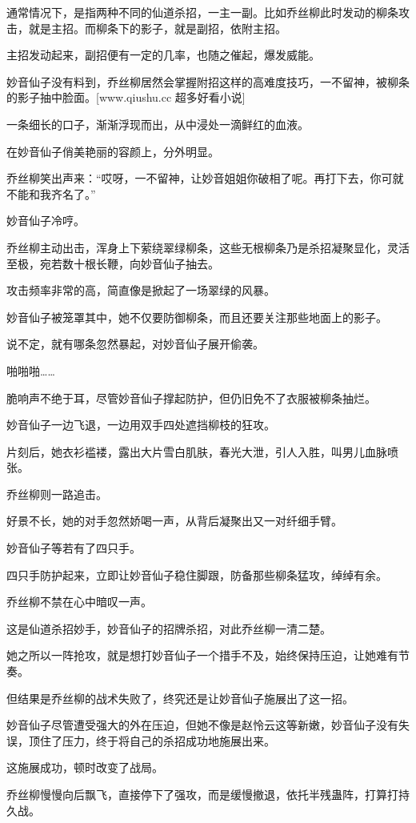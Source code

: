 \begin{this_body}
通常情况下，是指两种不同的仙道杀招，一主一副。比如乔丝柳此时发动的柳条攻击，就是主招。而柳条下的影子，就是副招，依附主招。

主招发动起来，副招便有一定的几率，也随之催起，爆发威能。

妙音仙子没有料到，乔丝柳居然会掌握附招这样的高难度技巧，一不留神，被柳条的影子抽中脸面。[www.qiushu.cc 超多好看小说]

一条细长的口子，渐渐浮现而出，从中浸处一滴鲜红的血液。

在妙音仙子俏美艳丽的容颜上，分外明显。

乔丝柳笑出声来：“哎呀，一不留神，让妙音姐姐你破相了呢。再打下去，你可就不能和我齐名了。”

妙音仙子冷哼。

乔丝柳主动出击，浑身上下萦绕翠绿柳条，这些无根柳条乃是杀招凝聚显化，灵活至极，宛若数十根长鞭，向妙音仙子抽去。

攻击频率非常的高，简直像是掀起了一场翠绿的风暴。

妙音仙子被笼罩其中，她不仅要防御柳条，而且还要关注那些地面上的影子。

说不定，就有哪条忽然暴起，对妙音仙子展开偷袭。

啪啪啪……

脆响声不绝于耳，尽管妙音仙子撑起防护，但仍旧免不了衣服被柳条抽烂。

妙音仙子一边飞退，一边用双手四处遮挡柳枝的狂攻。

片刻后，她衣衫褴褛，露出大片雪白肌肤，春光大泄，引人入胜，叫男儿血脉喷张。

乔丝柳则一路追击。

好景不长，她的对手忽然娇喝一声，从背后凝聚出又一对纤细手臂。

妙音仙子等若有了四只手。

四只手防护起来，立即让妙音仙子稳住脚跟，防备那些柳条猛攻，绰绰有余。

乔丝柳不禁在心中暗叹一声。

这是仙道杀招妙手，妙音仙子的招牌杀招，对此乔丝柳一清二楚。

她之所以一阵抢攻，就是想打妙音仙子一个措手不及，始终保持压迫，让她难有节奏。

但结果是乔丝柳的战术失败了，终究还是让妙音仙子施展出了这一招。

妙音仙子尽管遭受强大的外在压迫，但她不像是赵怜云这等新嫩，妙音仙子没有失误，顶住了压力，终于将自己的杀招成功地施展出来。

这施展成功，顿时改变了战局。

乔丝柳慢慢向后飘飞，直接停下了强攻，而是缓慢撤退，依托半残蛊阵，打算打持久战。


\end{this_body}
